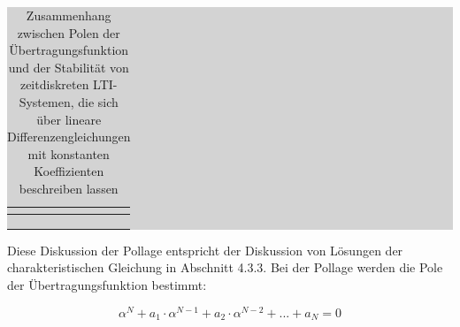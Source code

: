 \begin{table}[H]
\setlength{\arrayrulewidth}{.1em}
\caption{Zusammenhang zwischen Polen der \"{U}bertragungsfunktion und der Stabilit\"{a}t von zeitdiskreten LTI-Systemen, die sich \"{u}ber lineare Differenzengleichungen mit konstanten Koeffizienten beschreiben lassen }
\setlength{\fboxsep}{0pt}%
\colorbox{lightgray}{%
%
\begin{tabular}{| c | c |}
\hline
\parbox[c][0.35in][c]{3.3in}{\smallskip\centering\textbf{\selectfont{Eigenschaft}}} & 
\parbox[c][0.35in][c]{3.3in}{\smallskip\centering\textbf{}}\\ \hline

\parbox[c][0.4in][c]{3.3in}{} & 
\parbox[c][0.4in][c]{3.3in}{}\\ \hline

\parbox[c][0.8in][c]{3.3in}{} & 
\parbox[c][0.8in][c]{3.3in}{}\\ \hline

\parbox[c][0.8in][c]{3.3in}{} & 
\parbox[c][0.8in][c]{3.3in}{}\\ \hline

\end{tabular}%
}
\label{tab:sixeight}
\end{table}

\noindent Diese Diskussion der Pollage entspricht der Diskussion von L\"{o}sungen der charakteristischen Gleichung in Abschnitt 4.3.3. Bei der Pollage werden die Pole der \"{U}bertragungsfunktion bestimmt:

\begin{equation}\label{eq:sixsonehundredtwentytwo}
\alpha ^{N} +a_{1} \cdot \alpha ^{N-1} +a_{2} \cdot \alpha ^{N-2} +...+a_{N} =0
\end{equation}

